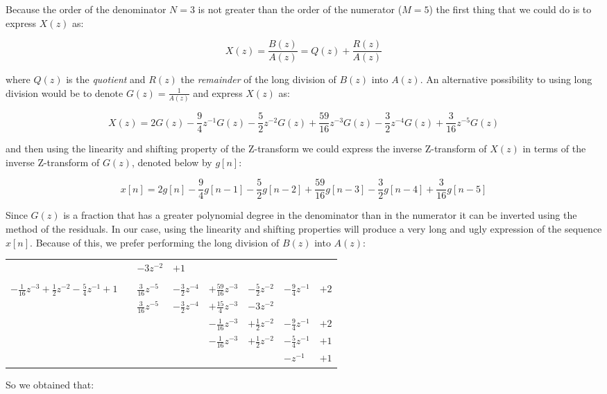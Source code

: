 \documentclass[a4paper,11pt,oneside]{article}
\begin{document}
Because the order of the denominator $N=3$ is not greater than the order of the numerator ($M=5$) the first thing that we could do is to express $X(z)$ as:

\begin{equation}\label{longdivision}
X(z)=\frac{B(z)}{A(z)}=Q(z)+\frac{R(z)}{A(z)}
\end{equation} 

where $Q(z)$ is the \emph{quotient} and $R(z)$ the \emph{remainder} of the long division of $B(z)$ into $A(z)$. An alternative possibility to using long division would be to denote $G(z)=\frac{1}{A(z)}$ and express $X(z)$ as:

\[
X(z) = 2G(z)-\frac{9}{4}z^{-1}G(z)-\frac{5}{2}z^{-2}G(z)+\frac{59}{16}z^{-3} G(z)-\frac{3}{2}z^{-4}G(z)+\frac{3}{16}z^{-5}G(z)
\]

and then using the linearity and shifting property of the Z-transform we could express the inverse Z-transform of $X(z)$ in terms of the inverse Z-transform of $G(z)$, denoted below by $g[n]$:

\[
x[n] = 2g[n]-\frac{9}{4}g[n-1]-\frac{5}{2}g[n-2]+\frac{59}{16}g[n-3]-\frac{3}{2}g[n-4]+\frac{3}{16}g[n-5]
\]

Since $G(z)$ is a fraction that has a greater polynomial degree in the denominator than in the numerator it can be inverted using the method of the residuals. In our case, using the linearity and shifting properties will produce a very long and ugly expression of the sequence $x[n]$. Because of this, we prefer performing the long division of $B(z)$ into $A(z)$:

\begin{tabular}{r|cllllll}
&\qquad&$-3z^{-2}$&$+1$&&&&\\
\cline{2-8}
\\
$-\frac{1}{16}z^{-3}+\frac{1}{2}z^{-2}-\frac{5}{4}z^{-1}+1$&&$\frac{3}{16}z^{-5}$&$-\frac{3}{2}z^{-4}$&$+\frac{59}{16}z^{-3}$&$-\frac{5}{2}z^{-2}$&$-\frac{9}{4}z^{-1}$&$+2$\\
&&$\frac{3}{16}z^{-5}$&$-\frac{3}{2}z^{-4}$&$+\frac{15}{4}z^{-3}$&$-3z^{-2}$&&\\
\cline{3-8}
&&&&$-\frac{1}{16}z^{-3}$&$+\frac{1}{2}z^{-2}$&$-\frac{9}{4}z^{-1}$&$+2$\\
&&&&$-\frac{1}{16}z^{-3}$&$+\frac{1}{2}z^{-2}$&$-\frac{5}{4}z^{-1}$&$+1$\\
\cline{5-8}
&&&&&&$-z^{-1}$&$+1$\\
\end{tabular}

So we obtained that:
\end{document}
